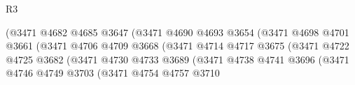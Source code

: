 \begin{lexlean}{R3}
\begin{coremodule}
                                                  (@3471
                                                    @4682
                                                    @4685
                                                    @3647
                                                    (@3471
                                                      @4690
                                                      @4693
                                                      @3654
                                                      (@3471
                                                        @4698
                                                        @4701
                                                        @3661
                                                        (@3471
                                                          @4706
                                                          @4709
                                                          @3668
                                                          (@3471
                                                            @4714
                                                            @4717
                                                            @3675
                                                            (@3471
                                                              @4722
                                                              @4725
                                                              @3682
                                                              (@3471
                                                                @4730
                                                                @4733
                                                                @3689
                                                                (@3471
                                                                  @4738
                                                                  @4741
                                                                  @3696
                                                                  (@3471
                                                                    @4746
                                                                    @4749
                                                                    @3703
                                                                    (@3471
                                                                      @4754
                                                                      @4757
                                                                      @3710

\end{coremodule}
\end{lexlean}
